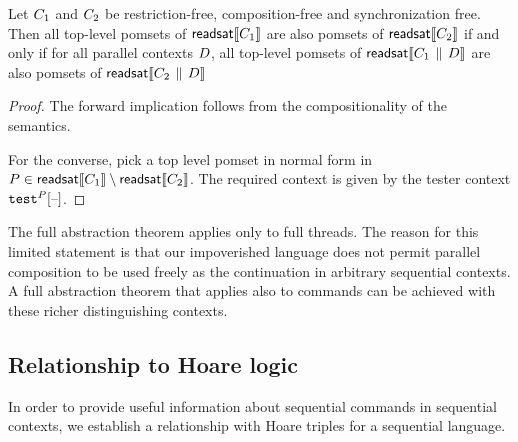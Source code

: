 \begin{theorem}
  Let $C_1$ and $C_2$ be restriction-free, composition-free and
  synchronization free.  Then all top-level pomsets of
  $\mathsf{readsat}\llbracket C_1\rrbracket$ are also pomsets of $\mathsf{readsat}\llbracket C_2\rrbracket$ if
  and only if for all parallel contexts $D$, all top-level pomsets of
  $\mathsf{readsat}\llbracket C_1 \,\mathbin{\|}\, D\rrbracket$ are also pomsets of
  $\mathsf{readsat}\llbracket C_2 \,\mathbin{\|}\, D\rrbracket$
\begin{proof}
  The forward implication follows from the compositionality of the semantics.

  For the converse, pick a top level pomset in normal form in
  $P \in \mathsf{readsat}\llbracket C_1\rrbracket \setminus \mathsf{readsat}\llbracket C_2\rrbracket $.  The
  required context is given by the tester context $\testP{\aPS}{}\hole{}$.
 \end{proof}
\end{theorem}

The full abstraction theorem applies only to full threads.  The reason for this limited statement is that our impoverished language does not permit  parallel composition to be used freely as the continuation in arbitrary sequential contexts.  A full abstraction theorem that applies also to commands can be achieved with these richer distinguishing contexts.  


\subsection{Relationship to Hoare logic}
In order to provide useful information about sequential commands in sequential contexts, we establish a relationship with Hoare triples for a sequential language.    

